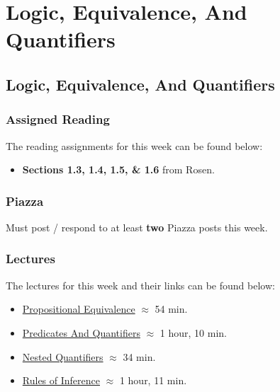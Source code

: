 \clearpage

\renewcommand{\ChapTitle}{Logic, Equivalence, And Quantifiers}
\renewcommand{\SectionTitle}{Logic, Equivalence, And Quantifiers}

\chapter{\ChapTitle}
\section{\SectionTitle}

\subsection{Assigned Reading}

The reading assignments for this week can be found below:

\begin{itemize}
    \item \textbf{Sections 1.3, 1.4, 1.5, \& 1.6} from Rosen.
\end{itemize}

\subsection{Piazza}

Must post / respond to at least \textbf{two} Piazza posts this week.  

\subsection{Lectures}

The lectures for this week and their links can be found below:

\begin{itemize}
    \item \href{https://applied.cs.colorado.edu/mod/hvp/view.php?id=51566}{Propositional Equivalence} $\approx$ 54 min.
    \item \href{https://applied.cs.colorado.edu/mod/hvp/view.php?id=51567}{Predicates And Quantifiers} $\approx$ 1 hour, 10 min.
    \item \href{https://applied.cs.colorado.edu/mod/hvp/view.php?id=51568}{Nested Quantifiers} $\approx$ 34 min.
    \item \href{https://applied.cs.colorado.edu/mod/hvp/view.php?id=51569}{Rules of Inference} $\approx$ 1 hour, 11 min.
\end{itemize}

